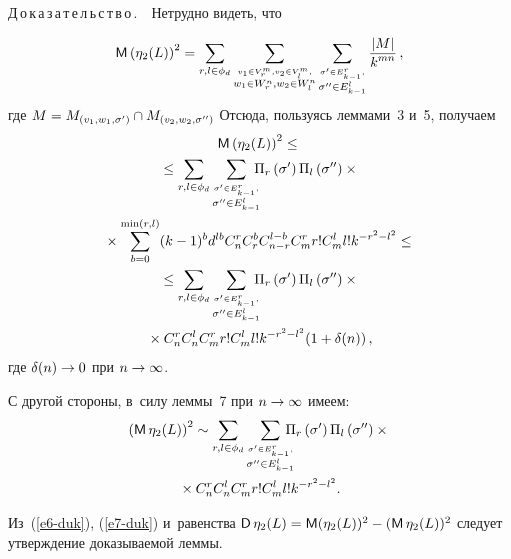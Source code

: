 \begin{multicols}{2}
    \noindent
    Д\,о\,к\,а\,з\,а\,т\,е\,л\,ь\,с\,т\,в\,о\,.\ \ Нетрудно видеть, что
    
    \noindent
    $$
    {\sf M} \left( \eta_2(L)\right)^2=\sum\limits_{r,l\in\phi_d} 
    \sum\limits_{\stackrel{v_1\in 
V_r^m, v_2\in V_l^m,}{w_1\in W_r^n, w_2\in W_l^n}} 
\sum\limits_{\stackrel{\sigma^\prime 
\in E^r_{k-1},}{\sigma^{\prime\prime}\in E^l_{k-1}}} \displaystyle\frac{\displaystyle \vert M\vert\mathstrut}{\displaystyle k^{mn}\mathstrut}\,,
    $$
где $M\hm= M_{(v_1, w_1, \sigma^\prime)} \cap M_{(v_2, 
w_2,\sigma^{\prime\prime})}$
 Отсюда, пользуясь леммами~3 и~5, получаем
 \begin{multline} 
{\sf M}\left( \eta_2(L)\right)^2\leq{}\\
{}\leq \sum\limits_{r,l\in \phi_d} \sum\limits_{\stackrel{\sigma^\prime\in E^r_{k-1},} 
{\sigma^{\prime\prime} \in E^l_{k-1}}}\hspace*{-6pt} \Pi_r\left(\sigma^\prime\right) \Pi_l\left( 
\sigma^{\prime\prime}\right)\times{}\\
{}\times \sum\limits_{b=0}^{\min(r,l)} (k-1)^b d^{lb} C_n^r 
C_r^b C_{n-r}^{l-b} C_m^r r! C_m^l l! k^{-r^2-l^2}\leq{}\\
{}\leq
\sum\limits_{r,l\in\phi_d} \sum\limits_{\stackrel{\sigma^\prime\in E^r_{k-1},} 
{\sigma^{\prime\prime}\in E^l_{k-1}}}\hspace*{-6pt}
 \Pi_r\left(\sigma^\prime\right) \Pi_l\left( 
\sigma^{\prime\prime}\right)\times{}\\
{}\times C_n^r C_n^l C_m^r r! C_m^l l! k^{-r^2-l^2}(1+\delta(n))\,,
\label{e6-duk}
\end{multline}
где $\delta(n)\hm\to 0$ при $n\hm\to \infty$.

\columnbreak

    С другой стороны, в~силу леммы~7 при $n\hm\to \infty$ имеем:
    \begin{multline}
    \left( {\sf M}\,\eta_2(L)\right)^2 \sim \sum\limits_{r,l\in \phi_d} 
\sum\limits_{\stackrel{\sigma^\prime\in E^r_{k-1},}
{ \sigma^{\prime\prime}\in E^l_{k-1}}} 
\hspace*{-8pt}
\Pi_r \left(\sigma^\prime\right) \Pi_l\left( \sigma^{\prime\prime}\right)\times{}\\
{}\times C_n^r C_n^l 
C_m^r r! C_m^l l! k^{-r^2-l^2}.
    \label{e7-duk}
    \end{multline}

    Из~(\ref{e6-duk}), (\ref{e7-duk}) и~равенства ${\sf D}\,\eta_2(L)\hm= {\sf 
M}(\eta_2(L))^2\hm- ({\sf M}\,\eta_2(L))^2$ следует утверждение доказываемой 
леммы.  
    

\end{multicols}
